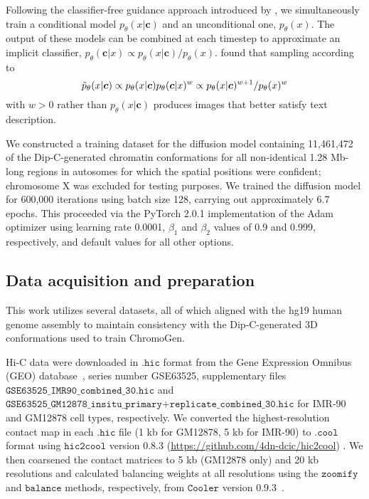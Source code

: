\documentclass[12pt,letterpaper]{article}
\begin{document}
Following the classifier-free guidance approach introduced by  \textcite{Ho2022a}, we simultaneously train a conditional model $p_\theta(x\vert \boldsymbol{c})$ and an unconditional one, $p_\theta(x)$. The output of these models can be combined at each timestep to approximate an implicit classifier, $p_\theta(\boldsymbol{c}\vert x) \propto p_\theta(x\vert \boldsymbol{c}) / p_\theta(x)$. \textcite{Ho2022a} found that sampling according to 
\begin{equation}\label{ptilde}
    \Tilde{p}_\theta(x\vert \boldsymbol{c})\propto p_\theta(x\vert \boldsymbol{c}) p_\theta(\boldsymbol{c}\vert x)^{w} \propto p_\theta(x\vert \boldsymbol{c})^{w+1} / p_\theta(x)^{w}
\end{equation}
with $w>0$ rather than $p_\theta(x\vert \boldsymbol{c})$ produces images that better satisfy text description. 


We constructed a training dataset for the diffusion model containing %
11,461,472 of the Dip-C-generated chromatin conformations for all non-identical 1.28 Mb-long regions in autosomes for which the spatial positions were confident; chromosome X was excluded for testing purposes. We trained the diffusion model for 600,000 iterations using batch size 128, carrying out approximately 6.7 epochs. 
This proceeded via the PyTorch 2.0.1 implementation of the Adam optimizer using learning rate 0.0001, $\beta_1$ and $\beta_2$ values of 0.9 and 0.999, respectively, and default values for all other options. 

\subsection*{Data acquisition and preparation}


This work utilizes several datasets, all of which aligned with the hg19 human genome assembly to maintain consistency with the Dip-C-generated 3D conformations used to train ChromoGen.  

Hi-C data were downloaded in $\texttt{.hic}$ format from the Gene Expression Omnibus (GEO) database~\cite{edgar_gene_2002}, series number GSE63525, supplementary files $\texttt{GSE63525\_IMR90\_combined\_30.hic}$ and \\
$\texttt{GSE63525\_GM12878\_insitu\_primary+replicate\_combined\_30.hic}$ for IMR-90 and GM12878 cell types, respectively. 
We converted the highest-resolution contact map in each $\texttt{.hic}$ file (1 kb for GM12878, 5 kb for IMR-90) to $\texttt{.cool}$ format using $\texttt{hic2cool}$ version 0.8.3 (\url{https://github.com/4dn-dcic/hic2cool}) \cite{reiff_4d_2022}. 
We then coarsened the contact matrices to 5 kb (GM12878 only) and 20 kb resolutions and calculated balancing weights at all resolutions using the $\texttt{zoomify}$ and $\texttt{balance}$ methods, respectively, from $\texttt{Cooler}$ version 0.9.3~\cite{abdennur_cooler_2020}. 
\end{document}
